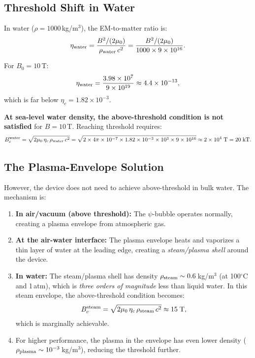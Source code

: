 \documentclass[11pt]{article}
\newcommand{\etac}{\eta_c}
\begin{document}
\subsection{Threshold Shift in Water}

In water ($\rho = 1000$\,kg/m$^3$), the EM-to-matter ratio is:
\begin{equation}
\eta_{\rm water} = \frac{B^2/(2\mu_0)}{\rho_{\rm water}\,c^2}
  = \frac{B^2/(2\mu_0)}{1000 \times 9 \times 10^{16}}.
\end{equation}

For $B_0 = 10$\,T:
\begin{equation}
\eta_{\rm water} = \frac{3.98 \times 10^7}{9 \times 10^{19}}
  \approx 4.4 \times 10^{-13},
\end{equation}
which is far below $\etac = 1.82 \times 10^{-3}$.

\textbf{At sea-level water density, the above-threshold condition is not
satisfied} for $B = 10$\,T. Reaching threshold requires:
\begin{equation}
B_c^{\rm water} = \sqrt{2\mu_0\,\etac\,\rho_{\rm water}\,c^2}
  = \sqrt{2 \times 4\pi \times 10^{-7} \times 1.82 \times 10^{-3}
  \times 10^3 \times 9 \times 10^{16}}
  \approx 2 \times 10^4\;\text{T} = 20\;\text{kT}.
\end{equation}

\subsection{The Plasma-Envelope Solution}

However, the device does not need to achieve above-threshold in bulk
water. The mechanism is:

\begin{enumerate}
\item \textbf{In air/vacuum (above threshold):} The $\psi$-bubble
  operates normally, creating a plasma envelope from atmospheric gas.

\item \textbf{At the air-water interface:} The plasma envelope heats
  and vaporizes a thin layer of water at the leading edge, creating a
  \emph{steam/plasma shell} around the device.

\item \textbf{In water:} The steam/plasma shell has density
  $\rho_{\rm steam} \sim 0.6$\,kg/m$^3$ (at 100$^\circ$C and 1\,atm),
  which is \emph{three orders of magnitude} less than liquid water.
  In this steam envelope, the above-threshold condition becomes:
  \begin{equation}
  B_c^{\rm steam} = \sqrt{2\mu_0\,\etac\,\rho_{\rm steam}\,c^2}
    \approx 15\;\text{T},
  \end{equation}
  which is marginally achievable.

\item For higher performance, the plasma in the envelope has even lower
  density ($\rho_{\rm plasma} \sim 10^{-3}$\,kg/m$^3$), reducing
  the threshold further.
\end{enumerate}
\end{document}
